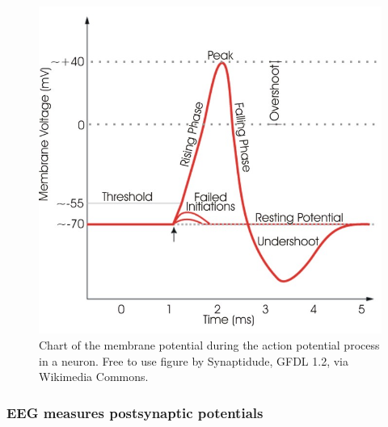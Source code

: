 \begin{figure}[ht]
    \centering
    \includegraphics[width=0.7\linewidth]{../images/biosignals/action_potential.jpg}
    \captionsetup{width=0.8\linewidth}
    \captionsetup{justification=centering}
    \caption{Chart of the membrane potential during the action potential process in a neuron. Free to use figure by Synaptidude, GFDL 1.2, via Wikimedia Commons.} 
    \label{fig:biomedical_signals_action_potential}
\end{figure}




\subsubsection{EEG measures postsynaptic potentials}
\label{subsubsec:biomedical_signals_biosignals_electrical_postsynaptic_potential}

